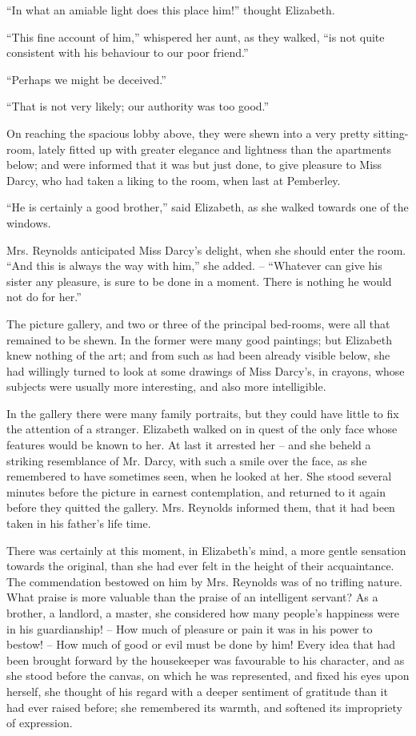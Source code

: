 “In what an amiable light does this place him!”
thought Elizabeth.

“This fine account of him,” whispered her aunt, as they
walked, “is not quite consistent with his behaviour to our
poor friend.”

“Perhaps we might be deceived.”

“That is not very likely; our authority was too good.”

On reaching the spacious lobby above, they were shewn
into a very pretty sitting-room, lately fitted up with
greater elegance and lightness than the apartments below;
and were informed that it was but just done, to give
pleasure to Miss Darcy, who had taken a liking to the room,
when last at Pemberley.

“He is certainly a good brother,” said Elizabeth, as
she walked towards one of the windows.

Mrs. Reynolds anticipated Miss Darcy’s delight, when
she should enter the room. “And this is always the way
with him,” she added. -- “Whatever can give his sister
any pleasure, is sure to be done in a moment. There is
nothing he would not do for her.”

The picture gallery, and two or three of the principal
bed-rooms, were all that remained to be shewn. In the
former were many good paintings; but Elizabeth knew
nothing of the art; and from such as had been already
visible below, she had willingly turned to look at some
drawings of Miss Darcy’s, in crayons, whose subjects were
usually more interesting, and also more intelligible.

In the gallery there were many family portraits, but
they could have little to fix the attention of a stranger.
Elizabeth walked on in quest of the only face whose
features would be known to her. At last it arrested her -- and
she beheld a striking resemblance of Mr. Darcy, with
such a smile over the face, as she remembered to have
sometimes seen, when he looked at her. She stood several
minutes before the picture in earnest contemplation, and
returned to it again before they quitted the gallery.
Mrs. Reynolds informed them, that it had been taken in
his father’s life time.

There was certainly at this moment, in Elizabeth’s
mind, a more gentle sensation towards the original, than
she had ever felt in the height of their acquaintance.
The commendation bestowed on him by Mrs. Reynolds
was of no trifling nature. What praise is more valuable
than the praise of an intelligent servant? As a brother,
a landlord, a master, she considered how many people’s
happiness were in his guardianship! -- How much of
pleasure or pain it was in his power to bestow! -- How
much of good or evil must be done by him! Every idea
that had been brought forward by the housekeeper was
favourable to his character, and as she stood before the
canvas, on which he was represented, and fixed his eyes
upon herself, she thought of his regard with a deeper
sentiment of gratitude than it had ever raised before;
she remembered its warmth, and softened its impropriety
of expression.

